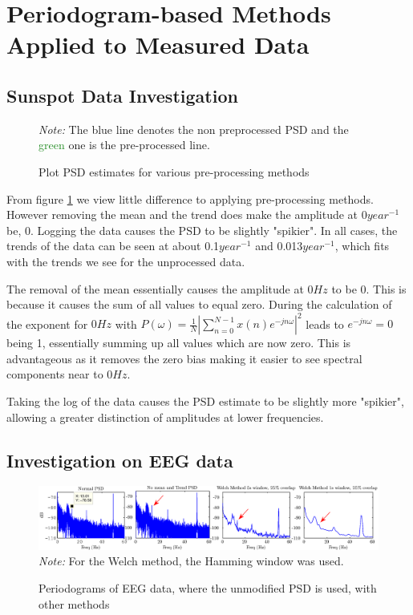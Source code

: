 \documentclass[10pt,twoside,a4paper]{report}
\begin{document}
\section{Periodogram-based Methods Applied to Measured Data}
\subsection{Sunspot Data Investigation}
\begin{figure}[h!]
\centering
%
\resizebox{\textwidth}{!}{}
%
\textit{Note:} The \textcolor{NavyBlue}{blue} line denotes the non preprocessed PSD and the \textcolor{ForestGreen}{green} one is the pre-processed line.
\caption{Plot PSD estimates for various pre-processing methods}
\label{fig:4a}
\end{figure}
From figure \ref{fig:4a} we view little difference to applying pre-processing methods. However removing the mean and the trend does make the amplitude at 0$year^{-1}$ be, 0. Logging the data causes the PSD to be slightly "spikier". In all cases, the trends of the data can be seen at about 0.1$year^{-1}$ and 0.013$year^{-1}$, which fits with the trends we see for the unprocessed data.

The removal of the mean essentially causes the amplitude at $0Hz$ to be 0. This is because it causes the sum of all values to equal zero. During the calculation of the exponent for $0Hz$ with $P(\omega) =  \frac{1}{N} \left| \sum_{n=0}^{N-1} x(n) e^{-j n \omega} \right|^{2}$ leads to $e^{-j n \omega} = 0$ being 1, essentially summing up all values which are now zero. This is advantageous as it removes the zero bias making it easier to see spectral components near to $0Hz$.

Taking the log of the data causes the PSD estimate to be slightly more "spikier", allowing a greater distinction of amplitudes at lower frequencies.


\subsection{Investigation on EEG data}
\begin{figure}[h!]
\centering
\includegraphics[width=\textwidth]{cw1im/4b1.eps}
\textit{Note:} For the Welch method, the Hamming window was used.
\resizebox{\textwidth}{!}{}
\resizebox{\textwidth}{!}{}
\caption{Periodograms of EEG data, where the unmodified PSD is used, with other methods}
\label{fig:1_4b1}
\end{figure}
\end{document}
